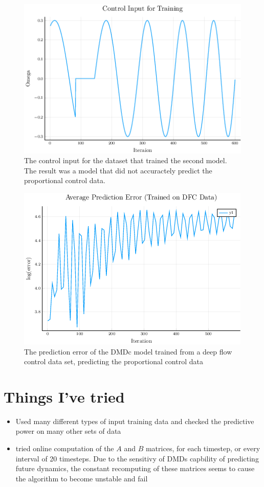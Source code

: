 \documentclass{article}
\begin{document}
\begin{figure}
  \centering
  \includegraphics[scale=0.5]{../images/dfc_control_input}
  \caption{The control input for the dataset that trained the second model. The result was a model that did not accuractely predict the proportional control data.}
  \label{fig:dfc_control_input} \end{figure}
\begin{figure}
  \centering
  \includegraphics[scale=0.5]{../images/pred_error_not_working}
  \caption{The prediction error of the DMDc model trained from a deep flow control data set, predicting the proportional control data}
  \label{fig:pred_error_not_working}
\end{figure}

\section*{Things I've tried}

\begin{itemize}
  \item Used many different types of input training data and checked the predictive power on many other sets of data
  \item tried online computation of the $A$ and $B$ matrices, for each timestep, or every interval of 20 timesteps. Due to the sensitivy of DMDs capbility of predicting future dynamics, the constant recomputing of these matrices seems to cause the algorithm to become unstable and fail
\end{itemize}
\end{document}
